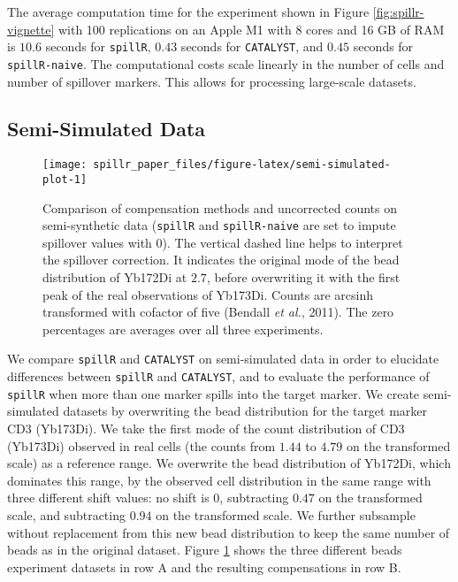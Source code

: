 \documentclass{bioinfo}
\begin{document}
The average computation time for the experiment shown in Figure
\ref{fig:spillr-vignette} with 100 replications on an Apple M1 with 8
cores and 16 GB of RAM is \(10.6\) seconds for \texttt{spillR}, \(0.43\)
seconds for \texttt{CATALYST}, and \(0.45\) seconds for
\texttt{spillR-naive}. The computational costs scale linearly in the
number of cells and number of spillover markers. This allows for
processing large-scale datasets.

\subsection{Semi-Simulated Data}

\label{semi-simulated-data}

\begin{figure}

{\centering \texttt{[image: spillr\_paper\_files/figure-latex/semi-simulated-plot-1]} 

}

\caption{Comparison of compensation methods and uncorrected counts on semi-synthetic data (\texttt{spillR} and \texttt{spillR-naive} are set to impute spillover values with $0$). The vertical dashed line helps to interpret the spillover correction. It indicates the original mode of the bead distribution of Yb172Di at $2.7$, before overwriting it with the first peak of the real observations of Yb173Di. Counts are arcsinh transformed with cofactor of five (Bendall \emph{et al.}, 2011). The zero percentages are averages over all three experiments.}\label{fig:semi-simulated-plot}
\end{figure}

We compare \texttt{spillR} and \texttt{CATALYST} on semi-simulated data
in order to elucidate differences between \texttt{spillR} and
\texttt{CATALYST}, and to evaluate the performance of \texttt{spillR}
when more than one marker spills into the target marker. We create
semi-simulated datasets by overwriting the bead distribution for the
target marker CD3 (Yb173Di). We take the first mode of the count
distribution of CD3 (Yb173Di) observed in real cells (the counts from
\(1.44\) to \(4.79\) on the transformed scale) as a reference range. We
overwrite the bead distribution of Yb172Di, which dominates this range,
by the observed cell distribution in the same range with three different
shift values: no shift is \(0\), subtracting \(0.47\) on the transformed
scale, and subtracting \(0.94\) on the transformed scale. We further
subsample without replacement from this new bead distribution to keep
the same number of beads as in the original dataset. Figure
\ref{fig:semi-simulated-plot} shows the three different beads experiment
datasets in row A and the resulting compensations in row B.
\end{document}
